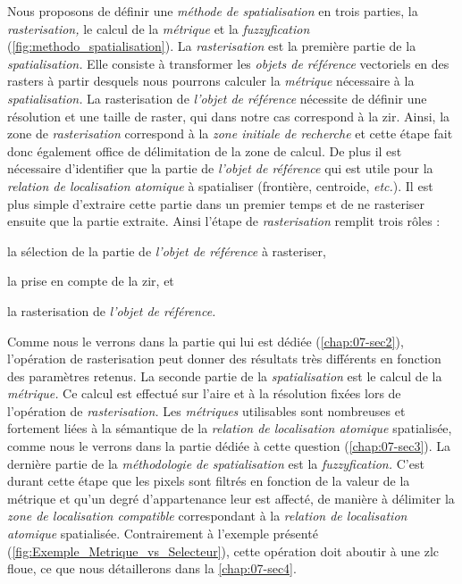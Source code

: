 Nous proposons de définir une \emph{méthode de spatialisation} en
trois parties, la \emph{rasterisation,} le calcul de la
\emph{métrique} et la \emph{fuzzyfication}
(\autoref{fig:methodo_spatialisation}). La \emph{rasterisation} est la
première partie de la \emph{spatialisation.} Elle consiste à
transformer les \emph{objets de référence} vectoriels en des rasters à
partir desquels nous pourrons calculer la \emph{métrique} nécessaire à
la \emph{spatialisation.} La rasterisation de \emph{l'objet de
  référence} nécessite de définir une résolution et une taille de
raster, qui dans notre cas correspond à la \ac{zir}. Ainsi, la zone de
\emph{rasterisation} correspond à la \emph{zone initiale de recherche}
et cette étape fait donc également office de délimitation de la zone
de calcul. De plus il est nécessaire d'identifier que la partie de
\emph{l'objet de référence} qui est utile pour la \emph{relation de
  localisation atomique} à spatialiser (\eg frontière, centroide,
\emph{etc.}). Il est plus simple d'extraire cette partie dans un
premier temps et de ne rasteriser ensuite que la partie
extraite. Ainsi l'étape de \emph{rasterisation} remplit trois rôles :
%
\begin{enumerate*}[label=(\alph*)]
\item la sélection de la partie de \emph{l'objet de référence} à rasteriser,
\item la prise en compte de la \ac{zir}, et
\item la rasterisation de \emph{l'objet de référence.}  
\end{enumerate*}
%
Comme nous le verrons dans la partie qui lui est dédiée
(\autoref{chap:07-sec2}), l'opération de rasterisation peut donner des
résultats très différents en fonction des paramètres retenus. La
seconde partie de la \emph{spatialisation} est le calcul de la
\emph{métrique.} Ce calcul est effectué sur l'aire et à la résolution
fixées lors de l'opération de \emph{rasterisation.} Les
\emph{métriques} utilisables sont nombreuses et fortement liées à la
sémantique de la \emph{relation de localisation atomique} spatialisée,
comme nous le verrons dans la partie dédiée à cette question
(\autoref{chap:07-sec3}). La dernière partie de la \emph{méthodologie
  de spatialisation} est la \emph{fuzzyfication.} C'est durant cette
étape que les pixels sont filtrés en fonction de la valeur de la
métrique et qu'un degré d'appartenance leur est affecté, de manière à
délimiter la \emph{zone de localisation compatible} correspondant à la
\emph{relation de localisation atomique} spatialisée. Contrairement à
l'exemple présenté (\autoref{fig:Exemple_Metrique_vs_Selecteur}),
cette opération doit aboutir à une \ac{zlc} floue, ce que nous
détaillerons dans la \autoref{chap:07-sec4}.


